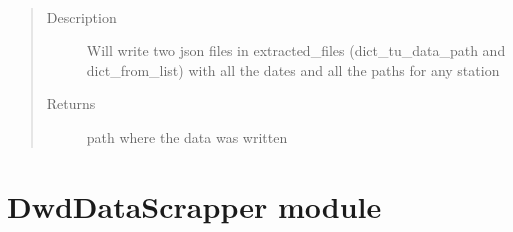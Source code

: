 \documentclass[letterpaper,10pt,english]{sphinxmanual}
\begin{document}
\begin{fulllineitems}
\begin{fulllineitems}
\end{fulllineitems}


\begin{fulllineitems}
\label{\detokenize{DwdDataPrep:DwdDataPrep.Writer.write_stations_paths}}~\begin{quote}\begin{description}
\item[{Description}] \leavevmode
\sphinxAtStartPar
Will write two json files in extracted\_files (dict\_tu\_data\_path and dict\_from\_list) with all the dates and all the paths for any station

\item[{Returns}] \leavevmode
\sphinxAtStartPar
path where the data was written

\end{description}\end{quote}

\end{fulllineitems}


\end{fulllineitems}



\section{DwdDataScrapper module}
\label{\detokenize{DwdDataScrapper:module-DwdDataScrapper}}\label{\detokenize{DwdDataScrapper:dwddatascrapper-module}}\label{\detokenize{DwdDataScrapper::doc}}
\end{document}

